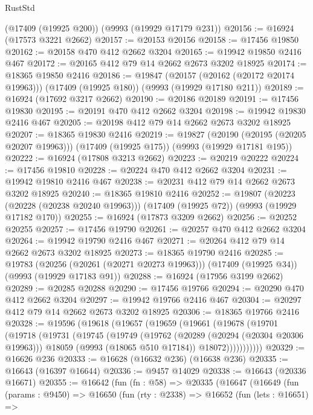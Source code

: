 \begin{lexlean}{RustStd}
\begin{coremodule}
    (@17409 (@19925 @200))
    (@9993 (@19929 @17179 @231))
@20156 := @16924 (@17573 @3221 @2662)
@20157 := @20153 @20156
@20158 := @17456 @19850
@20162 := @20158 @470 @412 @2662 @3204
@20165 := @19942 @19850 @2416 @467
@20172 := @20165 @412 @79 @14 @2662 @2673 @3202 @18925
@20174 := @18365 @19850 @2416
@20186 := @19847
    (@20157 (@20162 (@20172 @20174 @19963)))
    (@17409 (@19925 @180))
    (@9993 (@19929 @17180 @211))
@20189 := @16924 (@17692 @3217 @2662)
@20190 := @20186 @20189
@20191 := @17456 @19830
@20195 := @20191 @470 @412 @2662 @3204
@20198 := @19942 @19830 @2416 @467
@20205 := @20198 @412 @79 @14 @2662 @2673 @3202 @18925
@20207 := @18365 @19830 @2416
@20219 := @19827
    (@20190 (@20195 (@20205 @20207 @19963)))
    (@17409 (@19925 @175))
    (@9993 (@19929 @17181 @195))
@20222 := @16924 (@17808 @3213 @2662)
@20223 := @20219 @20222
@20224 := @17456 @19810
@20228 := @20224 @470 @412 @2662 @3204
@20231 := @19942 @19810 @2416 @467
@20238 := @20231 @412 @79 @14 @2662 @2673 @3202 @18925
@20240 := @18365 @19810 @2416
@20252 := @19807
    (@20223 (@20228 (@20238 @20240 @19963)))
    (@17409 (@19925 @72))
    (@9993 (@19929 @17182 @170))
@20255 := @16924 (@17873 @3209 @2662)
@20256 := @20252 @20255
@20257 := @17456 @19790
@20261 := @20257 @470 @412 @2662 @3204
@20264 := @19942 @19790 @2416 @467
@20271 := @20264 @412 @79 @14 @2662 @2673 @3202 @18925
@20273 := @18365 @19790 @2416
@20285 := @19783
    (@20256 (@20261 (@20271 @20273 @19963)))
    (@17409 (@19925 @34))
    (@9993 (@19929 @17183 @91))
@20288 := @16924 (@17956 @3199 @2662)
@20289 := @20285 @20288
@20290 := @17456 @19766
@20294 := @20290 @470 @412 @2662 @3204
@20297 := @19942 @19766 @2416 @467
@20304 := @20297 @412 @79 @14 @2662 @2673 @3202 @18925
@20306 := @18365 @19766 @2416
@20328 := @19596
    (@19618
      (@19657
        (@19659
          (@19661
            (@19678
              (@19701
                (@19718
                  (@19731
                    (@19745
                      (@19749
                        (@19762
                          (@20289 (@20294 (@20304 @20306 @19963)))
                          @18059
                          (@9993 (@18065 @510 @17184))
                          @18072)))))))))))
@20329 := @16626 @236
@20333 := @16628 (@16632 @236) (@16638 @236)
@20335 := @16643 (@16397 @16644)
@20336 := @9457 @14029
@20338 := @16643 (@20336 @16671)
@20355 := @16642
    (fun (fn : @58) =>
    @20335
      (@16647
        (@16649
          (fun (params : @9450) =>
          @16650
            (fun (rty : @2338) =>
            @16652
              (fun (lets : @16651) =>

\end{coremodule}
\end{lexlean}

